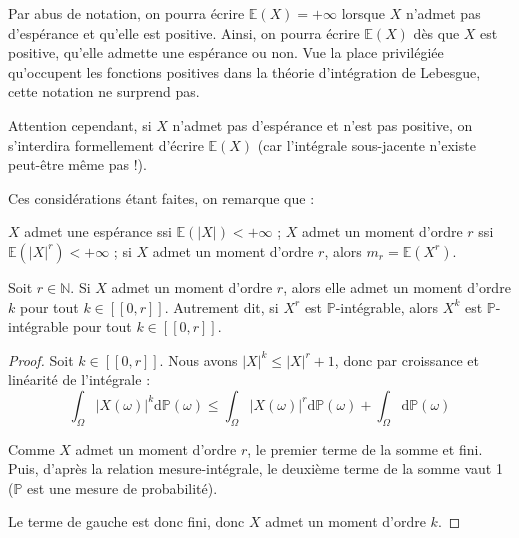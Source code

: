 \documentclass[../integ-proba.tex]{subfiles}
\begin{document}
\begin{rem}
    Par abus de notation, on pourra écrire $\mathbb{E}(X)=+\infty$ lorsque $X$ n'admet pas d'espérance et qu'elle est positive.
    Ainsi, on pourra écrire $\mathbb{E}(X)$ dès que $X$ est positive, qu'elle admette une espérance ou non.
    Vue la place privilégiée qu'occupent les fonctions positives dans la théorie d'intégration de Lebesgue, cette notation ne surprend pas.
    
    Attention cependant, si $X$ n'admet pas d'espérance et n'est pas positive, on s'interdira formellement d'écrire $\mathbb{E}(X)$ (car l'intégrale sous-jacente n'existe peut-être même pas !).
\end{rem}

\begin{rem}
    Ces considérations étant faites, on remarque que :
    \begin{itemize}
        \itemb $X$ admet une espérance ssi $\mathbb{E}(\left| X \right|) < +\infty$ ;
        \itemb $X$ admet un moment d'ordre $r$ ssi $\mathbb{E}(\left| X \right|^r) < +\infty$ ;
        \itemb si $X$ admet un moment d'ordre $r$, alors $m_r = \mathbb{E}(X^r)$.
    \end{itemize}
\end{rem}

\begin{prop}
    \label{prop:moments_cascade}
    Soit $r\in\mathbb{N}$. Si $X$ admet un moment d'ordre $r$, alors elle admet un moment d'ordre $k$ pour tout $k\in[\![0,r]\!]$.
    Autrement dit, si $X^r$ est $\mathbb{P}$-intégrable, alors $X^k$ est $\mathbb{P}$-intégrable pour tout $k\in[\![0,r]\!]$.
\end{prop}

\begin{proof}
    Soit $k\in[\![0,r]\!]$. Nous avons $\left|X\right|^k \leq \left|X\right|^r+1$, donc par croissance et linéarité de l'intégrale :
    $$
    \int_\Omega \left|X(\omega)\right|^k \text{d}\mathbb{P}(\omega) \leq \int_\Omega \left|X(\omega)\right|^r \text{d}\mathbb{P}(\omega) + \int_\Omega \text{d}\mathbb{P}(\omega)
    $$

    Comme $X$ admet un moment d'ordre $r$, le premier terme de la somme et fini.
    Puis, d'après la relation mesure-intégrale, le deuxième terme de la somme vaut 1 ($\mathbb{P}$ est une mesure de probabilité).
    
    Le terme de gauche est donc fini, donc $X$ admet un moment d'ordre $k$.
\end{proof}
\end{document}
